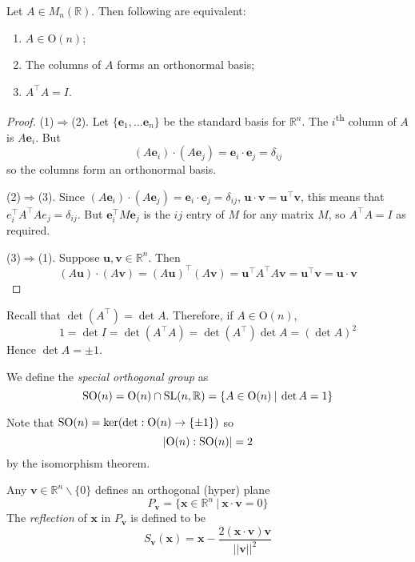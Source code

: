 \documentclass[10pt, a4paper, twoside]{report}
\begin{document}
\begin{lemma}
    Let \(A\in M_n(\mathbb{R})\). Then following are equivalent:
    \begin{enumerate}
        \item \(A\in\mathrm{O}(n)\);
        \item The columns of \(A\) forms an orthonormal basis;
        \item \(A^\intercal A=I\).
    \end{enumerate}
\end{lemma}
\begin{proof}
    (1)\(\Rightarrow\)(2). Let \(\{\mathbf{e}_1,\ldots\mathbf{e}_n\}\) be the standard basis for \(\mathbb{R}^n\). The \(i\)\textsuperscript{th} column of \(A\) is \(A\mathbf{e}_i\). But 
    \[(A\mathbf{e}_i)\cdot(A\mathbf{e}_j)=\mathbf{e}_i\cdot\mathbf{e}_j=\delta_{ij}\]
    so the columns form an orthonormal basis.

    (2)\(\Rightarrow\)(3). Since \((A\mathbf{e}_i)\cdot(A\mathbf{e}_j)=\mathbf{e}_i\cdot\mathbf{e}_j=\delta_{ij}\), \(\mathbf{u}\cdot\mathbf{v}=\mathbf{u}^\intercal\mathbf{v}\), this means that \(e_i^\intercal A^\intercal Ae_j=\delta_{ij}\). But \(\mathbf{e}_i^\intercal M\mathbf{e}_j\) is the \(ij\) entry of \(M\) for any matrix \(M\), so \(A^\intercal A=I\) as required.

    (3)\(\Rightarrow\)(1). Suppose \(\mathbf{u},\mathbf{v}\in\mathbb{R}^n\). Then 
    \[(A\mathbf{u})\cdot(A\mathbf{v})=(A\mathbf{u})^\intercal(A\mathbf{v})=\mathbf{u}^\intercal A^\intercal A\mathbf{v}=\mathbf{u}^\intercal\mathbf{v}=\mathbf{u}\cdot\mathbf{v}\]
\end{proof}
Recall that \(\det(A^\intercal)=\det A\). Therefore, if \(A\in\mathrm{O}(n)\), 
\[1=\det I=\det(A^\intercal A)=\det(A^\intercal)\det A=(\det A)^2\]
Hence \(\det A=\pm 1\). 
\begin{definition}
    We define the \emph{special orthogonal group} as 
    \[\operatorname{SO}(n)=\mathrm{O}(n)\cap\operatorname{SL}(n,\mathbb{R})=\{A\in\mathrm{O}(n)\:|\:\det A=1\}\]
\end{definition}
Note that \(\operatorname{SO}(n)=\ker(\det:\mathrm{O}(n)\to\{\pm 1\})\) so 
\[|\mathrm{O}(n):\operatorname{SO}(n)|=2\]
by the isomorphism theorem.
\begin{definition}
    Any \(\mathbf{v}\in\mathbb{R}^n\backslash\{0\}\) defines an orthogonal (hyper) plane 
    \[P_\mathbf{v}=\{\mathbf{x}\in\mathbb{R}^n\:|\:\mathbf{x}\cdot\mathbf{v}=0\}\]
    The \emph{reflection} of \(\mathbf{x}\) in \(P_\mathbf{v}\) is defined to be 
    \[S_\mathbf{v}(\mathbf{x})=\mathbf{x}-\frac{2(\mathbf{x}\cdot\mathbf{v})\mathbf{v}}{||\mathbf{v}||^2}\]
\end{definition}
\end{document}
